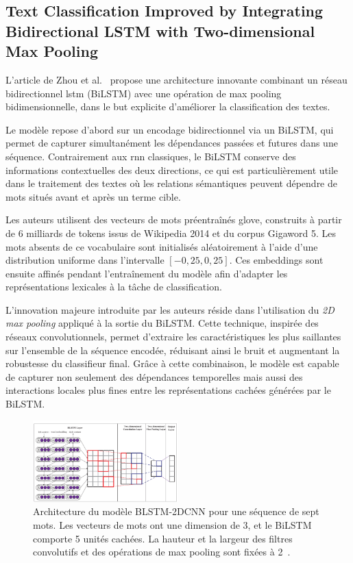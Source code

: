 \documentclass[12pt]{report}
\begin{document}
\subsection{Text Classification Improved by Integrating Bidirectional LSTM with Two-dimensional Max Pooling}

L’article de Zhou et al.~\cite{zhou2015text} propose une architecture innovante combinant un réseau bidirectionnel \gls{lstm} (BiLSTM) avec une opération de max pooling bidimensionnelle, dans le but explicite d'améliorer la classification des textes.

Le modèle repose d'abord sur un encodage bidirectionnel via un BiLSTM, qui permet de capturer simultanément les dépendances passées et futures dans une séquence. Contrairement aux \gls{rnn} classiques, le BiLSTM conserve des informations contextuelles des deux directions, ce qui est particulièrement utile dans le traitement des textes où les relations sémantiques peuvent dépendre de mots situés avant et après un terme cible.

Les auteurs utilisent des vecteurs de mots préentraînés \gls{glove}, construits à partir de 6 milliards de tokens issus de Wikipedia 2014 et du corpus Gigaword 5. Les mots absents de ce vocabulaire sont initialisés aléatoirement à l’aide d’une distribution uniforme dans l’intervalle $[-0{,}25, 0{,}25]$. Ces embeddings sont ensuite affinés pendant l’entraînement du modèle afin d’adapter les représentations lexicales à la tâche de classification.

L’innovation majeure introduite par les auteurs réside dans l’utilisation du \textit{2D max pooling} appliqué à la sortie du BiLSTM. Cette technique, inspirée des réseaux convolutionnels, permet d’extraire les caractéristiques les plus saillantes sur l’ensemble de la séquence encodée, réduisant ainsi le bruit et augmentant la robustesse du classifieur final. Grâce à cette combinaison, le modèle est capable de capturer non seulement des dépendances temporelles mais aussi des interactions locales plus fines entre les représentations cachées générées par le BiLSTM.

\begin{figure}[H]
    \centering
    \includegraphics[width=0.5\textwidth]{bilstm.png}
    \caption{Architecture du modèle BLSTM-2DCNN pour une séquence de sept mots. Les vecteurs de mots ont une dimension de 3, et le BiLSTM comporte 5 unités cachées. La hauteur et la largeur des filtres convolutifs et des opérations de max pooling sont fixées à 2~\cite{zhou2015text}.}
    \label{fig:bilstm-arch}
\end{figure}
\end{document}
